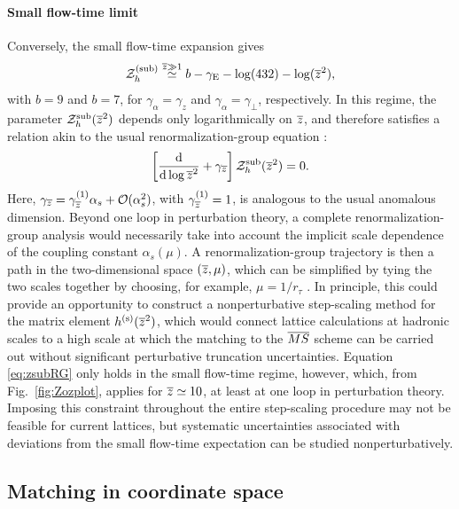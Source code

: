 \paragraph{Small flow-time limit} Conversely, the small flow-time expansion gives
\begin{equation}\label{eq:zsmalltau}
{\cal Z}_h^{\mathrm{(sub)}} \stackrel{\overline{z}\gg1}{\simeq} b - \gamma_{\mathrm{E}} - \log(432) - \log(\overline{z}^2),
\end{equation}
with $b = 9$ and $b=7$, for $\gamma_\alpha = \gamma_z$ and $\gamma_\alpha = \gamma_\perp$, respectively. In this regime, the parameter ${\cal Z}_h^{\mathrm{sub}}(\overline{z}^2)$ depends only logarithmically on $\overline{z}$, and therefore satisfies a relation akin to the usual renormalization-group equation \cite{Monahan:2015lha}:
\begin{equation}\label{eq:zsubRG}
\left[\frac{\mathrm{d}}{\mathrm{d}\log\overline{z}^2} +\gamma_{\overline{z}}\right]{\cal Z}_h^{\mathrm{sub}}(\overline{z}^2) = 0.
\end{equation}
Here, $\gamma_{\overline{z}} = \gamma_{\overline{z}}^{(1)}\alpha_s+{\cal O}(\alpha_s^2)$, with $\gamma_{\overline{z}}^{(1)}=1$, is analogous to the usual anomalous dimension. Beyond one loop in perturbation theory, a complete renormalization-group analysis would necessarily take into account the implicit scale dependence of the coupling constant $\alpha_s(\mu)$. A renormalization-group trajectory is then a path in the two-dimensional space $(\overline{z},\mu)$, which can be simplified by tying the two scales together by choosing, for example, $\mu = 1/r_\tau$ \cite{Monahan:2015lha}. In principle, this could provide an opportunity to construct a nonperturbative step-scaling method for the matrix element $h^{(\mathrm{s})}(\overline{z}^2)$, which would connect lattice calculations at hadronic scales to a high scale at which the matching to the $\overline{MS}$ scheme can be carried out without significant perturbative truncation uncertainties. Equation \eqref{eq:zsubRG} only holds in the small flow-time regime, however, which, from Fig.~\ref{fig:Zozplot}, applies for $\overline{z} \simeq 10$, at least at one loop in perturbation theory. Imposing this constraint throughout the entire step-scaling procedure may not be feasible for current lattices, but systematic uncertainties associated with deviations from the small flow-time expectation can be studied nonperturbatively.


\subsection{Matching in coordinate space}

